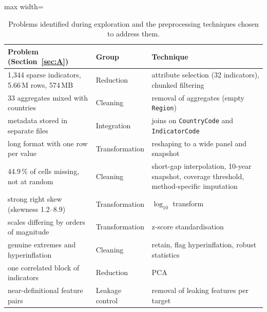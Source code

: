 \documentclass[11pt,a4paper]{article}
\newcommand{\var}[1]{\texttt{#1}}
\begin{document}
\begin{table}[htbp]\centering\small
\caption{Problems identified during exploration and the preprocessing techniques chosen to address them.}\label{tab:findings}
\begin{adjustbox}{max width=\textwidth}\begin{tabular}{p{6.3cm}lp{6.3cm}}
\toprule
Problem (Section~\ref{sec:A}) & Group & Technique \\
\midrule
1,344 sparse indicators, 5.66\,M rows, 574\,MB & Reduction & attribute selection (32 indicators), chunked filtering \\
33 aggregates mixed with countries & Cleaning & removal of aggregates (empty \var{Region}) \\
metadata stored in separate files & Integration & joins on \var{CountryCode} and \var{IndicatorCode} \\
long format with one row per value & Transformation & reshaping to a wide panel and snapshot \\
44.9\,\% of cells missing, not at random & Cleaning & short-gap interpolation, 10-year snapshot, coverage threshold, method-specific imputation \\
strong right skew (skewness 1.2--8.9) & Transformation & $\log_{10}$ transform \\
scales differing by orders of magnitude & Transformation & z-score standardisation \\
genuine extremes and hyperinflation & Cleaning & retain, flag hyperinflation, robust statistics \\
one correlated block of indicators & Reduction & PCA \\
near-definitional feature pairs & Leakage control & removal of leaking features per target \\
\bottomrule
\end{tabular}\end{adjustbox}
\end{table}
\end{document}
